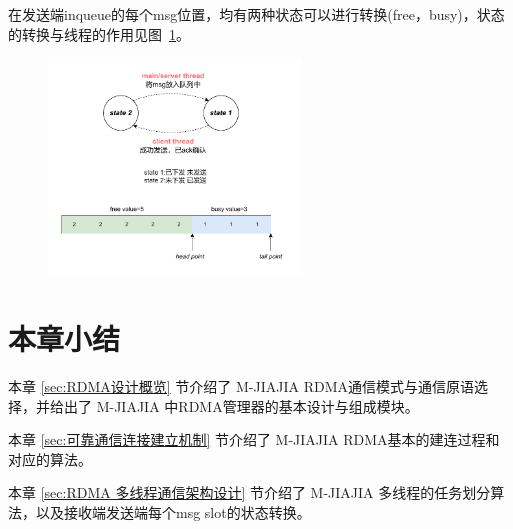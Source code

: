 {    在发送端inqueue的每个msg位置，均有两种状态可以进行转换(free，busy)，状态的转换与线程的作用见图~\ref{fig:RDMA-send-state}。
    \begin{figure}[H]
        \centering
        \includegraphics[width=0.6\textwidth]{Img/send_state.drawio.pdf}
        \label{fig:RDMA-send-state}
    \end{figure}

    \section{本章小结}
    本章 \ref{sec:RDMA设计概览} 节介绍了 M-JIAJIA RDMA通信模式与通信原语选择，并给出了 M-JIAJIA 中RDMA管理器的基本设计与组成模块。

    本章 \ref{sec:可靠通信连接建立机制} 节介绍了 M-JIAJIA RDMA基本的建连过程和对应的算法。

    本章 \ref{sec:RDMA 多线程通信架构设计} 节介绍了 M-JIAJIA 多线程的任务划分算法，以及接收端发送端每个msg slot的状态转换。
}